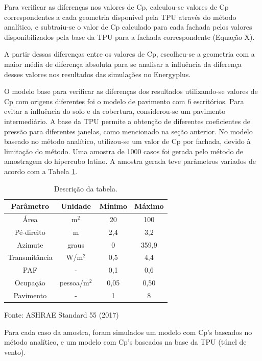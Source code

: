 \documentclass[brazil,hardcopy,openany,a5paper]{ufscthesis}
\begin{document}
		Para verificar as diferenças nos valores de Cp, calculou-se valores de Cp correspondentes a cada geometria disponível pela TPU através do método analítico, e subtraiu-se o valor de Cp calculado para cada fachada pelos valores disponibilizados pela base da TPU para a fachada correspondente (Equação X).
		
		A partir dessas diferenças entre os valores de Cp, escolheu-se a geometria com a maior média de diferença absoluta para se analisar a influência da diferença desses valores nos resultados das simulações no Energyplus.
		
		O modelo base para verificar as diferenças dos resultados utilizando-se valores de Cp com origens diferentes foi o modelo de pavimento com 6 escritórios. Para evitar a influência do solo e da cobertura, considerou-se um pavimento intermediário. A base da TPU permite a obtenção de diferentes coeficientes de pressão para diferentes janelas, como mencionado na seção anterior. No modelo baseado no método analítico, utilizou-se um valor de Cp por fachada, devido à limitação do método. Uma amostra de 1000 casos foi gerada pelo método de amostragem do hipercubo latino. A amostra gerada teve parâmetros variados de acordo com a Tabela \ref{table:cpmethod}.
		
		\begin{table}[h]
			\centering
			\caption{Descrição da tabela.}
			\label{table:cpmethod}
			\begin{tabular}{|c |c |c |c |}
				\hline
				\textbf{Parâmetro} & \textbf{Unidade} & \textbf{Mínimo} & \textbf{Máximo} \\
				\hline
				Área & m$^2$ & 20 & 100 \\
				\hline
				Pé-direito & m & 2,4 & 3,2 \\
				\hline
				Azimute & graus & 0 & 359,9 \\
				\hline 
				Transmitância & W/m$^2$ & 0,5 & 4,4 \\
				\hline 
				PAF & - & 0,1 & 0,6 \\
				\hline 
				Ocupação & pessoa/m$^2$ & 0,05 & 0,50 \\
				\hline 
				Pavimento & - & 1 & 8 \\
				\hline 
			\end{tabular}
			\begin{flushleft}
				Fonte: ASHRAE Standard 55 (2017)
			\end{flushleft}				
		\end{table}
				
		Para cada caso da amostra, foram simulados um modelo com Cp’s baseados no método analítico, e um modelo com Cp’s baseados na base da TPU (túnel de vento).
		
\end{document}
